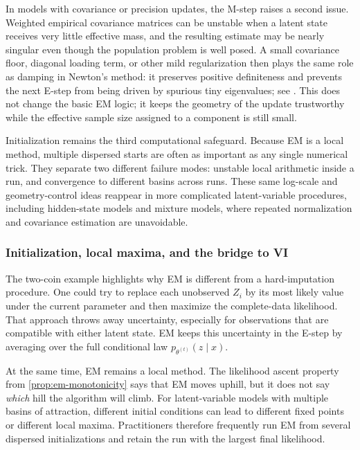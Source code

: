 In models with covariance or precision updates, the M-step raises a second issue.
Weighted empirical covariance matrices can be unstable when a latent state receives very little effective mass, and the resulting estimate may be nearly singular even though the population problem is well posed.
A small covariance floor, diagonal loading term, or other mild regularization then plays the same role as damping in Newton's method: it preserves positive definiteness and prevents the next E-step from being driven by spurious tiny eigenvalues; see .
This does not change the basic EM logic; it keeps the geometry of the update trustworthy while the effective sample size assigned to a component is still small.

Initialization remains the third computational safeguard.
Because EM is a local method, multiple dispersed starts are often as important as any single numerical trick.
They separate two different failure modes: unstable local arithmetic inside a run, and convergence to different basins across runs.
These same log-scale and geometry-control ideas reappear in more complicated latent-variable procedures, including hidden-state models and mixture models, where repeated normalization and covariance estimation are unavoidable.

\subsubsection{Initialization, local maxima, and the bridge to VI}
\label{subsubsec:em-local-behavior}

The two-coin example highlights why EM is different from a hard-imputation procedure.
One could try to replace each unobserved $Z_i$ by its most likely value under the current parameter and then maximize the complete-data likelihood.
That approach throws away uncertainty, especially for observations that are compatible with either latent state.
EM keeps this uncertainty in the E-step by averaging over the full conditional law \(p_{\theta^{(t)}}(z\mid x)\).

At the same time, EM remains a local method.
The likelihood ascent property from \cref{prop:em-monotonicity} says that EM moves uphill, but it does not say \emph{which} hill the algorithm will climb.
For latent-variable models with multiple basins of attraction, different initial conditions can lead to different fixed points or different local maxima.
Practitioners therefore frequently run EM from several dispersed initializations and retain the run with the largest final likelihood.

